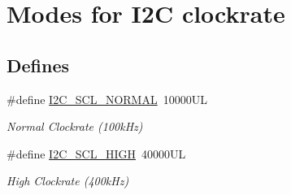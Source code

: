 \hypertarget{group___i2_c___s_c_l___m_o_d_e_s}{\section{\-Modes for \-I2\-C clockrate}
\label{group___i2_c___s_c_l___m_o_d_e_s}
}
\subsection*{\-Defines}
\begin{DoxyCompactItemize}
\item 
\hypertarget{group___i2_c___s_c_l___m_o_d_e_s_ga5f9f8d213ca31b74210ead375f3e0fcd}{\#define \hyperlink{group___i2_c___s_c_l___m_o_d_e_s_ga5f9f8d213ca31b74210ead375f3e0fcd}{\-I2\-C\-\_\-\-S\-C\-L\-\_\-\-N\-O\-R\-M\-A\-L}~10000\-U\-L}\label{group___i2_c___s_c_l___m_o_d_e_s_ga5f9f8d213ca31b74210ead375f3e0fcd}

\begin{DoxyCompactList}\small\item\em \-Normal \-Clockrate (100k\-Hz) \end{DoxyCompactList}\item 
\hypertarget{group___i2_c___s_c_l___m_o_d_e_s_gaced20b32c9a185f76434c0594f34b12d}{\#define \hyperlink{group___i2_c___s_c_l___m_o_d_e_s_gaced20b32c9a185f76434c0594f34b12d}{\-I2\-C\-\_\-\-S\-C\-L\-\_\-\-H\-I\-G\-H}~40000\-U\-L}\label{group___i2_c___s_c_l___m_o_d_e_s_gaced20b32c9a185f76434c0594f34b12d}

\begin{DoxyCompactList}\small\item\em \-High \-Clockrate (400k\-Hz) \end{DoxyCompactList}\end{DoxyCompactItemize}
